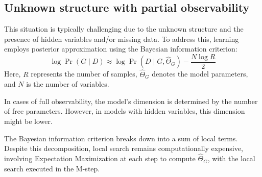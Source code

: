 \subsection{Unknown structure with partial observability}
This situation is typically challenging due to the unknown structure and the presence of hidden variables and/or missing data. 
To address this, learning employs posterior approximation using the Bayesian information criterion:
\[\log\Pr(G\mid D) \approx \log\Pr(D\mid G,\widehat{\Theta}_G)-\dfrac{N\log R}{2}\]
Here, $R$ represents the number of samples, $\widehat{\Theta}_G$ denotes the model parameters, and $N$ is the number of variables.

In cases of full observability, the model's dimension is determined by the number of free parameters.
However, in models with hidden variables, this dimension might be lower.

The Bayesian information criterion breaks down into a sum of local terms.
Despite this decomposition, local search remains computationally expensive, involving Expectation Maximization at each step to compute $\widehat{\Theta}_G$, with the local search executed in the M-step.